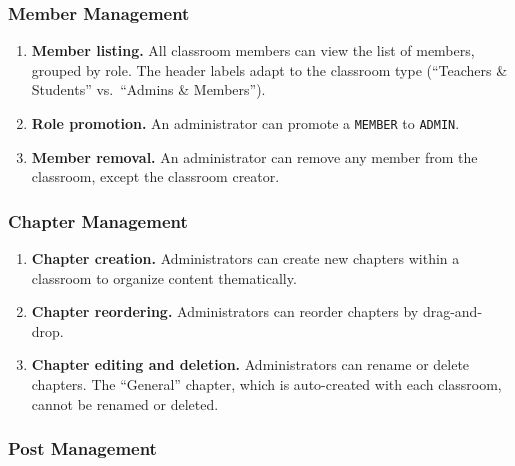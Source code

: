 \subsubsection{Member Management}

\begin{enumerate}[label=\textbf{FR-\arabic*.}, leftmargin=2.5cm, resume]
  \item \textbf{Member listing.}
        All classroom members can view the list of members, grouped by role.
        The header labels adapt to the classroom type (``Teachers \& Students'' vs.\ ``Admins \& Members'').

  \item \textbf{Role promotion.}
        An administrator can promote a \texttt{MEMBER} to \texttt{ADMIN}.

  \item \textbf{Member removal.}
        An administrator can remove any member from the classroom, except the classroom creator.
\end{enumerate}


\subsubsection{Chapter Management}

\begin{enumerate}[label=\textbf{FR-\arabic*.}, leftmargin=2.5cm, resume]
  \item \textbf{Chapter creation.}
        Administrators can create new chapters within a classroom to organize content thematically.

  \item \textbf{Chapter reordering.}
        Administrators can reorder chapters by drag-and-drop.

  \item \textbf{Chapter editing and deletion.}
        Administrators can rename or delete chapters.
        The ``General'' chapter, which is auto-created with each classroom, cannot be renamed or deleted.
\end{enumerate}

\subsubsection{Post Management}

